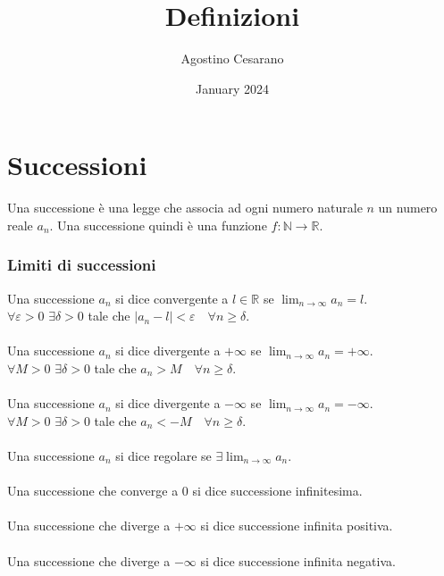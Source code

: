 \documentclass{article}
\title{Definizioni}
\author{Agostino Cesarano}
\date{January 2024}
\begin{document}
\maketitle

\part{Successioni}
Una successione è una legge che associa ad ogni numero naturale $n$ un numero
reale $a_n$. Una successione quindi è una funzione
$f:\mathbb{N}\rightarrow\mathbb{R}$.
\section*{Limiti di successioni}
Una successione $a_n$ si dice convergente a $l\in\mathbb{R}$ se $\lim_{n\to\infty}a_n=l$.\\
$\forall \varepsilon>0$ $\exists \delta>0$ tale che $|a_n-l|<\varepsilon\quad\forall n\geq \delta$.\\\\
Una successione $a_n$ si dice divergente a $+\infty$ se
$\lim_{n\to\infty}a_n=+\infty$.\\ $\forall M>0$ $\exists \delta>0$ tale che
$a_n>M\quad\forall n\geq \delta$.\\\\ Una successione $a_n$ si dice divergente
a $-\infty$ se $\lim_{n\to\infty}a_n=-\infty$.\\ $\forall M>0$ $\exists
    \delta>0$ tale che $a_n<-M\quad\forall n\geq \delta$.\\\\
Una successione $a_n$ si dice regolare se $\exists\lim_{n\to\infty}a_n$.\\\\
Una successione che converge a $0$ si dice successione infinitesima.\\\\ Una
successione che diverge a $+\infty$ si dice successione infinita positiva.\\\\
Una successione che diverge a $-\infty$ si dice successione infinita negativa.
\newpage
\end{document}
